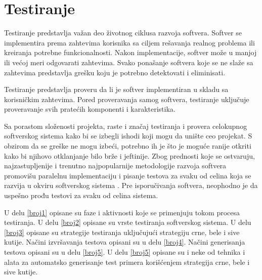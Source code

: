 \documentclass[12pt,oneside]{memoir}
\begin{document}
\chapter{Testiranje} \label{testiranje}

Testiranje predstavlja važan deo životnog ciklusa razvoja softvera. 
Softver se implementira prema zahtevima korisnika sa ciljem rešavanja realnog problema ili kreiranja potrebne funkcionalnosti. Nakon implementacije, softver može u manjoj ili većoj meri odgovarati zahtevima. Svako ponašanje softvera koje se ne slaže sa zahtevima predstavlja grešku koju je potrebno detektovati i eliminisati. 
\par
Testiranje predstavlja proveru da li je softver implementiran u skladu sa korisničkim zahtevima. Pored proveravanja samog softvera, testiranje uključuje proveravanje svih pratećih komponenti i karakteristika. 
\par 
Sa porastom složenosti projekta, raste i značaj testiranja i provera celokupnog softverskog sistema kako bi se izbegli ishodi koji mogu da unište ceo projekat. 
S obzirom da se greške ne mogu izbeći, potrebno ih je što je moguće ranije otkriti kako bi njihovo otklanjanje bilo brže i jeftinije. Zbog prednosti koje se ostvaruju, najzastupljenije i trenutno najpopularnije metodologije razvoja softvera promovišu paralelnu implementaciju i pisanje testova za svaku od celina koja se razvija u okviru softverskog sistema \cite{AgileDevelopment}. Pre isporučivanja softvera, neophodno je da uspešno prođu testovi za svaku od celina sistema.
\par 

U delu \ref{broj1} opisane su faze i aktivnosti koje se primenjuju tokom procesa testiranja. U delu \ref{broj2} opisane su vrste testiranja softverskog sistema. U delu \ref{broj3} opisane su strategije testiranja uključujući strategiju crne, bele i sive kutije. Načini izvršavanja testova opisani su u delu \ref{broj4}. Načini generisanja testova opisani su u delu \ref{broj5}. U delu \ref{broj5} opisane su i neke od tehnika i alata za automatsko generisanje test primera korišćenjem strategija crne, bele i sive kutije. 
\end{document}
